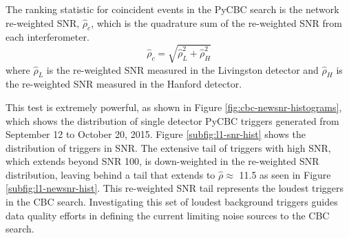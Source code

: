 The ranking statistic for coincident events in the PyCBC search is the network
re-weighted SNR, $\hat{\rho}_{c}$, which is the quadrature sum of the re-weighted
SNR from each interferometer.  
\begin{equation}
\hat{\rho}_{c} = \sqrt{\hat{\rho}^2_L + \hat{\rho}^2_H}
\end{equation}
where $\hat{\rho}_L$ is the re-weighted SNR measured in the Livingston detector 
and $\hat{\rho}_H$ is the re-weighted SNR measured in the Hanford detector.

This test is extremely powerful, as shown in Figure \ref{fig:cbc-newsnr-histograms}, which shows the
distribution of single detector PyCBC triggers generated from September 12 to October 20, 2015.
Figure \ref{subfig:l1-snr-hist} shows the distribution of triggers in SNR. The extensive tail of
triggers with high SNR, which extends beyond SNR 100, is down-weighted in the re-weighted SNR distribution,
leaving behind a tail that extends to $\hat{\rho} \approx$ 11.5 as seen in Figure \ref{subfig:l1-newsnr-hist}.
This re-weighted SNR tail represents the loudest triggers in the CBC search. Investigating this set of
loudest background triggers guides data quality efforts in defining the current limiting noise sources
to the CBC search.


